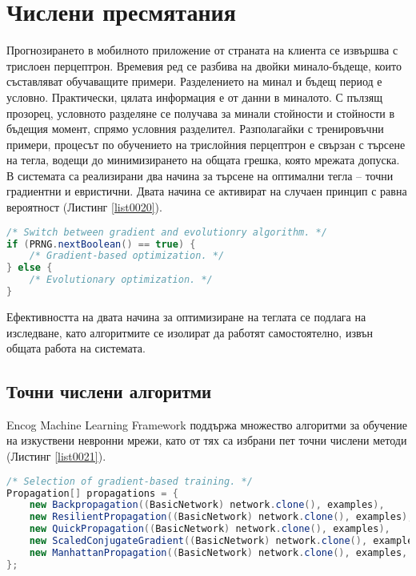 \chapter{Числени пресмятания}

Прогнозирането в мобилното приложение от страната на клиента се извършва с трислоен перцептрон. Времевия ред се разбива на двойки минало-бъдеще, които съставляват обучаващите примери. Разделението на минал и бъдещ период е условно. Практически, цялата информация е от данни в миналото. С пълзящ прозорец, условното разделяне се получава за минали стойности и стойности в бъдещия момент, спрямо условния разделител. Разполагайки с тренировъчни примери, процесът по обучението на трислойния перцептрон е свързан с търсене на тегла, водещи до минимизирането на общата грешка, която мрежата допуска. В системата са реализирани два начина за търсене на оптимални тегла – точни градиентни и евристични. Двата начина се активират на случаен принцип с равна вероятност (Листинг \ref{list0020}).

\begin{lstlisting}[caption=Превключване на алгоритмите за обучение, language=Java, basicstyle=\tiny, label=list0020]
/* Switch between gradient and evolutionry algorithm. */
if (PRNG.nextBoolean() == true) {
	/* Gradient-based optimization. */
} else {
	/* Evolutionary optimization. */
}
\end{lstlisting}

Ефективността на двата начина за оптимизиране на теглата се подлага на изследване, като алгоритмите се изолират да работят самостоятелно, извън общата работа на системата. 

\section{Точни числени алгоритми}

Encog Machine Learning Framework поддържа множество алгоритми за обучение на изкуствени невронни мрежи, като от тях са избрани пет точни числени методи (Листинг \ref{list0021}).

\begin{lstlisting}[caption=Набор от точни числени методи, language=Java, basicstyle=\tiny, label=list0021]
/* Selection of gradient-based training. */
Propagation[] propagations = {
	new Backpropagation((BasicNetwork) network.clone(), examples),
	new ResilientPropagation((BasicNetwork) network.clone(), examples),
	new QuickPropagation((BasicNetwork) network.clone(), examples),
	new ScaledConjugateGradient((BasicNetwork) network.clone(), examples),
	new ManhattanPropagation((BasicNetwork) network.clone(), examples, PRNG.nextDouble())
};
\end{lstlisting}

